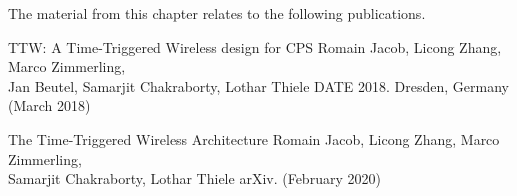 \pagebreak
\begin{publi}

  The material from this chapter relates to the following publications.

  \inlineRef%
  {TTW: A Time-Triggered Wireless design for CPS}%
  {Romain Jacob, Licong Zhang, Marco Zimmerling, \\Jan Beutel, Samarjit Chakraborty, Lothar Thiele}%
  {DATE 2018. Dresden, Germany (March 2018)}

  \inlineRef%
  {The Time-Triggered Wireless Architecture}%
  {Romain Jacob, Licong Zhang, Marco Zimmerling, \\Samarjit Chakraborty, Lothar Thiele}%
  {arXiv. (February 2020)}

\end{publi}
